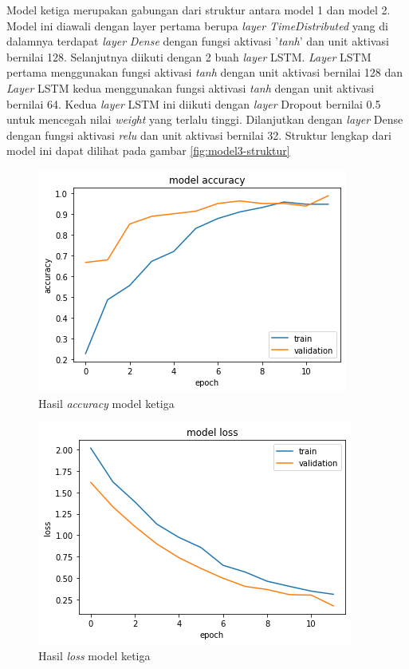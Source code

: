 Model ketiga merupakan gabungan dari struktur antara model 1 dan model 2. Model ini diawali dengan layer pertama berupa \emph{layer} \textit{TimeDistributed} yang di dalamnya terdapat \emph{layer} \textit{Dense} dengan fungsi aktivasi '\textit{tanh}' dan unit aktivasi bernilai 128. Selanjutnya diikuti dengan 2 buah \emph{layer} LSTM. \emph{Layer} LSTM pertama menggunakan fungsi aktivasi \emph{tanh} dengan unit aktivasi bernilai 128 dan \emph{Layer} LSTM kedua menggunakan fungsi aktivasi \emph{tanh} dengan unit aktivasi bernilai 64. Kedua \emph{layer} LSTM ini diikuti dengan \emph{layer} Dropout bernilai 0.5 untuk mencegah nilai \emph{weight} yang terlalu tinggi. Dilanjutkan dengan \emph{layer} Dense dengan fungsi aktivasi \emph{relu} dan unit aktivasi bernilai 32. Struktur lengkap dari model ini dapat dilihat pada gambar \ref{fig:model3-struktur}

\begin{figure}[H]
  \centering

  \includegraphics[scale=0.75]{gambar/bab4-uji-model-best-acc.png}

  \caption{Hasil \emph{accuracy} model ketiga}
  \label{fig:model3-train-acc}
\end{figure}

\begin{figure}[H]
  \centering

  \includegraphics[scale=0.75]{gambar/bab4-uji-model-best-loss.png}

  \caption{Hasil \emph{loss} model ketiga}
  \label{fig:model3-train-loss}
\end{figure}


